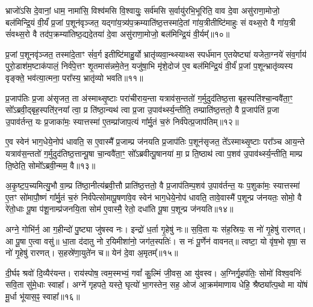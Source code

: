 भ्राजो॑\-ऽसि दे॒वानां॒ धाम॒ नामा॑सि॒ विश्व॑मसि वि॒श्वायुः॒ सर्व॑मसि स॒र्वायु॑रभि॒भूरिति॒ वाव दे॒वा असु॑राणा॒मोजो॒ बल॑मिन्द्रि॒यं वी॒र्यं॑ प्र॒जां प॒शून॑वृञ्जत॒ यद्गा॑य॒त्र्य॑प॒क्रम्याति॑ष्ठ॒त्तस्मा॑दे॒तां गा॑य॒त्रीतीष्टि॑माहुः सं वथ्स॒रो वै गा॑य॒त्री सं॑वथ्स॒रो वै तद॑प॒क्रम्या॑तिष्ठ॒द्यदे॒तया॑ दे॒वा असु॑राणा॒मोजो॒ बल॑मिन्द्रि॒यं वी॒र्यम्᳚॥१०॥

प्र॒जां प॒शूनवृ॑ञ्जत॒ तस्मा॑दे॒ताꣳ सं॑व॒र्ग इतीष्टि॑माहु॒र्यो भ्रातृ॑व्यवा॒न्थ्स्याथ्स स्पर्ध॑मान ए॒तयेष्ट्या॑ यजेता॒ग्नये॑ संव॒र्गाय॑ पुरो॒डाश॑म॒ष्टाक॑पालं॒ निर्व॑पे॒त्तꣳ शृ॒तमास॑न्नमे॒तेन॒ यजु॑षा॒भि मृ॑शे॒दोज॑ ए॒व बल॑मिन्द्रि॒यं वी॒र्यं॑ प्र॒जां प॒शून्भ्रातृ॑व्यस्य वृङ्क्ते॒ भव॑त्या॒त्मना॒ परा᳚स्य॒ भ्रातृ॑व्यो भवति॥११॥

{\anuvakamend[{बल॑मस्ये॒तया॑ दे॒वा असु॑राणा॒मोजो॒ बल॑मिन्द्रि॒यं वी॒र्यं॑ पञ्च॑चत्वारिꣳशच्च॥३॥}]}

प्र॒जाप॑तिः प्र॒जा अ॑सृजत॒ ता अ॑स्माथ्सृ॒ष्टाः परा॑चीराय॒न्ता यत्राव॑स॒न्ततो॑ ग॒र्मुदुद॑तिष्ठ॒त्ता बृह॒स्पति॑श्चा॒न्ववै॑ता॒ꣳ॒ सो᳚\-ऽब्रवी॒द्बृह॒स्पति॑र॒नया᳚ त्वा॒ प्र ति॑ष्ठा॒न्यथ॑ त्वा प्र॒जा उ॒पाव॑र्थ्स्य॒न्तीति॒ तम्प्राति॑ष्ठ॒त्ततो॒ वै प्र॒जाप॑तिं प्र॒जा उ॒पाव॑र्तन्त॒ यः प्र॒जाका॑मः॒ स्यात्तस्मा॑ ए॒तम्प्रा॑जाप॒त्यं गा᳚र्मु॒तं च॒रुं निर्व॑पेत्प्र॒जाप॑तिम्॥१२॥

ए॒व स्वेन॑ भाग॒धेये॒नोप॑ धावति॒ स ए॒वास्मै᳚ प्र॒जाम्प्र ज॑नयति प्र॒जाप॑तिः प॒शून॑सृजत॒ ते᳚\-ऽस्माथ्सृ॒ष्टाः परा᳚ञ्च आय॒न्ते यत्राव॑स॒न्ततो॑ ग॒र्मुदुद॑तिष्ठ॒त्तान्पू॒षा चा॒न्ववै॑ता॒ꣳ॒ सो᳚\-ऽब्रवीत्पू॒षानया॑ मा॒ प्र ति॒ष्ठाथ॑ त्वा प॒शव॑ उ॒पाव॑र्थ्स्य॒न्तीति॒ माम्प्र ति॒ष्ठेति॒ सोमो᳚\-ऽब्रवी॒न्मम॒ वै॥१३॥

अ॒कृ॒ष्ट॒प॒च्यमित्यु॒भौ वा॒म्प्र ति॑ष्ठा॒नीत्य॑ब्रवी॒त्तौ प्राति॑ष्ठ॒त्ततो॒ वै प्र॒जाप॑तिम्प॒शव॑ उ॒पाव॑र्तन्त॒ यः प॒शुका॑मः॒ स्यात्तस्मा॑ ए॒तꣳ सो॑मापौ॒ष्णं गा᳚र्मु॒तं च॒रुं निर्व॑पेत्सोमापू॒षणा॑वे॒व स्वेन॑ भाग॒धेये॒नोप॑ धावति॒ तावे॒वास्मै॑ प॒शून्प्र ज॑नयतः॒ सोमो॒ वै रे॑तो॒धाः पू॒षा प॑शू॒नाम्प्र॑जनयि॒ता सोम॑ ए॒वास्मै॒ रेतो॒ दधा॑ति पू॒षा प॒शून्प्र ज॑नयति॥१४॥

{\anuvakamend[{व॒पे॒त्प्र॒जाप॑तिं॒ वै दधा॑ति पू॒षा त्रीणि॑ च॥४॥}]}

अग्ने॒ गोभि॑र्न॒ आ ग॒हीन्दो॑ पु॒ष्ट्या जु॑षस्व नः। इन्द्रो॑ ध॒र्ता गृ॒हेषु॑ नः॥ स॒वि॒ता यः स॑ह॒स्रियः॒ स नो॑ गृ॒हेषु॑ रारणत्। आ पू॒षा ए॒त्वा वसु॑॥ धा॒ता द॑दातु नो र॒यिमीशा॑नो॒ जग॑त॒स्पतिः॑। स नः॑ पू॒र्णेन॑ वावनत्॥ त्वष्टा॒ यो वृ॑ष॒भो वृषा॒ स नो॑ गृ॒हेषु॑ रारणत्। स॒हस्रे॑णा॒युते॑न च॥ येन॑ दे॒वा अ॒मृतम्᳚॥१५॥

दी॒र्घꣴ श्रवो॑ दि॒व्यैर॑यन्त। राय॑स्पोष॒ त्वम॒स्मभ्यं॒ गवां᳚ कु॒ल्मिं जी॒वस॒ आ यु॑वस्व। अ॒ग्निर्गृ॒हप॑तिः॒ सोमो॑ विश्व॒वनिः॑ सवि॒ता सु॑मे॒धाः स्वाहा᳚। अग्ने॑ गृहपते॒ यस्ते॒ घृत्यो॑ भा॒गस्तेन॒ सह॒ ओज॑ आ॒क्रम॑माणाय धेहि॒ श्रैष्ठ्या᳚त्प॒थो मा यो॑षं मू॒र्धा भू॑यास॒ꣴ॒ स्वाहा᳚॥१६॥

